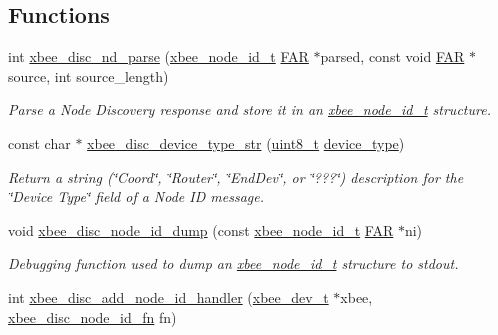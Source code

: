 \subsection*{Functions}
\begin{DoxyCompactItemize}
\item 
int \hyperlink{group__xbee__discovery_ga1efd48449a49119fc19ab9843af5ef6c}{xbee\-\_\-disc\-\_\-nd\-\_\-parse} (\hyperlink{structxbee__node__id__t}{xbee\-\_\-node\-\_\-id\-\_\-t} \hyperlink{group__hal_gaef060b3456fdcc093a7210a762d5f2ed}{F\-A\-R} $\ast$parsed, const void \hyperlink{group__hal_gaef060b3456fdcc093a7210a762d5f2ed}{F\-A\-R} $\ast$source, int source\-\_\-length)
\begin{DoxyCompactList}\small\item\em Parse a Node Discovery response and store it in an \hyperlink{structxbee__node__id__t}{xbee\-\_\-node\-\_\-id\-\_\-t} structure. \end{DoxyCompactList}\item 
const char $\ast$ \hyperlink{group__xbee__discovery_ga8eb851e497917304412328f434af7c95}{xbee\-\_\-disc\-\_\-device\-\_\-type\-\_\-str} (\hyperlink{group__hal_gae1affc9ca37cfb624959c866a73f83c2}{uint8\-\_\-t} \hyperlink{group__xbee__discovery_gab9c960832b7e834e6657e0c6ab4c3d8a}{device\-\_\-type})
\begin{DoxyCompactList}\small\item\em Return a string (\char`\"{}\-Coord\char`\"{}, \char`\"{}\-Router\char`\"{}, \char`\"{}\-End\-Dev\char`\"{}, or \char`\"{}???\char`\"{}) description for the \char`\"{}\-Device Type\char`\"{} field of a Node I\-D message. \end{DoxyCompactList}\item 
void \hyperlink{group__xbee__discovery_gab155a485a9aa4870a45dd86d1d468c52}{xbee\-\_\-disc\-\_\-node\-\_\-id\-\_\-dump} (const \hyperlink{structxbee__node__id__t}{xbee\-\_\-node\-\_\-id\-\_\-t} \hyperlink{group__hal_gaef060b3456fdcc093a7210a762d5f2ed}{F\-A\-R} $\ast$ni)
\begin{DoxyCompactList}\small\item\em Debugging function used to dump an \hyperlink{structxbee__node__id__t}{xbee\-\_\-node\-\_\-id\-\_\-t} structure to stdout. \end{DoxyCompactList}\item 
int \hyperlink{group__xbee__discovery_ga59a0294fbcb1b9f43b8436d4ec3a5a9e}{xbee\-\_\-disc\-\_\-add\-\_\-node\-\_\-id\-\_\-handler} (\hyperlink{structxbee__dev__t}{xbee\-\_\-dev\-\_\-t} $\ast$xbee, \hyperlink{group__xbee__device_ga55de36532265a72bffa969d5353800d7}{xbee\-\_\-disc\-\_\-node\-\_\-id\-\_\-fn} fn)

\end{DoxyCompactItemize}
